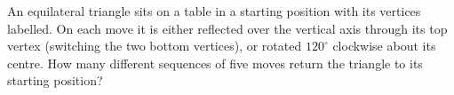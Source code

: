 An equilateral triangle sits on a table in a starting position with its vertices labelled. On each move it is either reflected over the vertical axis through its top vertex (switching the two bottom vertices), or rotated $120^\circ$ clockwise about its centre. How many different sequences of five moves return the triangle to its starting position?
